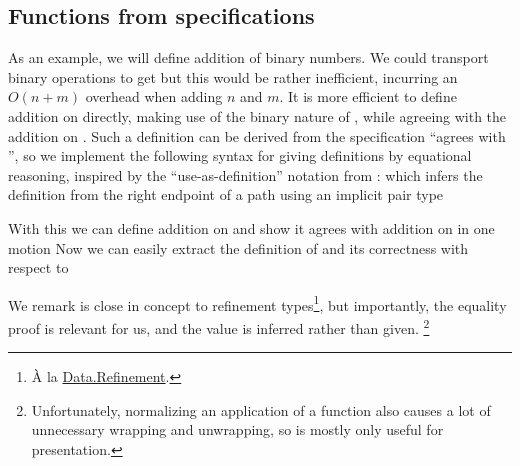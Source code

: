 \subsection{Functions from specifications}\label{ssec:useas}
As an example, we will define addition of binary numbers. We could transport binary operations
to get
but this would be rather inefficient, incurring an $O(n + m)$ overhead when adding $n$ and $m$. It is more efficient to define addition on \bL{} directly, making use of the binary nature of \bL{}, while agreeing with the addition on \bN{}. Such a definition can be derived from the specification ``agrees with \AgdaFunction{\_+\_}'', so we implement the following syntax for giving definitions by equational reasoning, inspired by the ``use-as-definition'' notation from \cite{calcdata}:
which infers the definition from the right endpoint of a path using an implicit pair type

With this we can define addition on \bL{} and show it agrees with addition on \bN{} in one motion
Now we can easily extract the definition of  and its correctness with respect to \AgdaFunction{\_+\_} 

We remark  is close in concept to refinement types\footnote{À la \href{https://agda.github.io/agda-stdlib/Data.Refinement.html}{Data.Refinement}.}, but importantly, the equality proof is relevant for us, and the value is inferred rather than given. \footnote{Unfortunately, normalizing an application of a  function also causes a lot of unnecessary wrapping and unwrapping, so  is mostly only useful for presentation.} %


